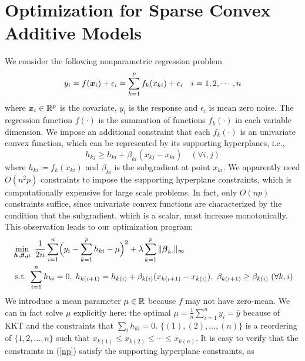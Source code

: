 \section{Optimization for Sparse Convex Additive Models}

We consider the following nonparametric regression problem
\begin{equation}\nonumber
          y_{i} = f(\boldsymbol{x}_{i}) + \epsilon_{i} = 
                  \sum_{k=1}^{p}f_{k}(x_{ki}) + \epsilon_{i} \quad i=1,2,\cdots,n
\end{equation}
where $\boldsymbol{x}_{i}\in\mathbb{R}^{p}$ is the covariate, $y_{i}$ is the
response and $\epsilon_{i}$ is mean zero noise. The regression function $f(\cdot)$ is the summation of 
functions $f_{k}(\cdot)$ in each variable dimension.  
We impose an additional constraint that each $f_{k}(\cdot)$ is 
an univariate convex function, which can be represented by its supporting hyperplanes, i.e.,
\begin{equation}\label{hyper}
      h_{kj} \geq h_{ki} + \beta_{ki}(x_{kj}-x_{ki}) \quad (\forall i,j)
\end{equation}
where $h_{ki}\coloneqq f_{k}(x_{ki})$ and $\beta_{ki}$ is the
subgradient at point $x_{ki}$. We apparently need $O(n^2 p)$ constraints to
impose the supporting hyperplane constraints, which is computationally
expensive for large scale problems.  In fact, only $O(np)$
constraints suffice, since univariate convex functions are
characterized by the condition that the subgradient, which is a scalar, must
increase monotonically. This observation leads to our optimization
program:
\begin{equation}\begin{split}\label{np}
       &\min_{\bds{h},\bds{\beta},\mu} \ \frac{1}{2n}\sum_{i=1}^{n}
                     \Bigl( y_{i}-\sum_{k=1}^{p}h_{ki} - \mu \Bigr)^{2} 
                         + \lambda\sum_{k=1}^{p}\|\bds{\beta}_{k\cdot}\|_{\infty} \\
       &\ \textrm{s.t.} \ \sum_{i=1}^{n}h_{ki}=0,\; h_{k(i+1)} = h_{k(i)} + \beta_{k(i)}(x_{k(i+1)}-x_{k(i)}), 
                                 \ \beta_{k(i+1)} \geq \beta_{k(i)} \ (\forall k, i)
\end{split}\end{equation}
We introduce a mean parameter $\mu \in \mathbb{R}$ because $f$ may not have zero-mean. We can in fact solve $\mu$ explicitly here: the optimal $\mu = \frac{1}{n} \sum_{i=1}^n y_i = \bar{y}$ because of KKT and the constraints that $\sum_i h_{ki} = 0$.
$\{(1),(2),\ldots,(n)\}$ is a reordering of $\{1,2,\ldots,n\}$ such that $x_{k(1)}\leq{}x_{k(2)}\leq\cdots\leq{}x_{k(n)}$.  It is easy to verify that the constraints in (\ref{np}) satisfy the supporting hyperplane constraints, as
